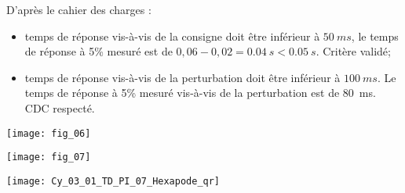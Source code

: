 
\ifprof
\begin{corrige}
D'après le cahier des charges :
\begin{itemize}
\item temps de réponse vis-à-vis de la consigne doit être inférieur à $\SI{50}{ms}$, le temps de réponse à 5\% mesuré est de $0,06-0,02 = \SI{0,04}{s} < \SI{0,05}{s}$. Critère validé;
\item temps de réponse vis-à-vis de la perturbation doit être inférieur à $\SI{100}{ms}$. Le temps de réponse à 5\% mesuré vis-à-vis de la perturbation est de \SI{80}{ms}. CDC respecté.
\end{itemize}
\end{corrige}
\else
\fi

\ifprof
\else
\begin{center}
\texttt{[image: fig\_06]}
\end{center}

\begin{center}
\texttt{[image: fig\_07]}
\end{center}
\fi

\ifprof
\else
\begin{marginfigure}[-3cm]
\centering
\texttt{[image: Cy\_03\_01\_TD\_PI\_07\_Hexapode\_qr]}
\end{marginfigure}
\fi
